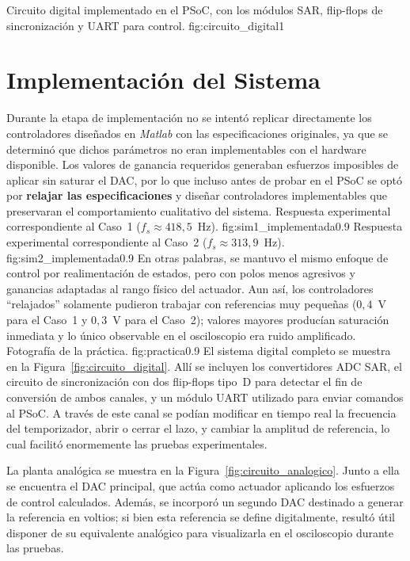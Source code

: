 
{Circuito digital implementado en el PSoC, con los módulos SAR, flip-flops de sincronización y UART para control.}
{fig:circuito_digital}{1}
\section{Implementación del Sistema}

Durante la etapa de implementación no se intentó replicar directamente los controladores diseñados en \textit{Matlab} con las especificaciones originales, 
ya que se determinó que dichos parámetros no eran implementables con el hardware disponible. 
Los valores de ganancia requeridos generaban esfuerzos imposibles de aplicar sin saturar el DAC, 
por lo que incluso antes de probar en el PSoC se optó por \textbf{relajar las especificaciones} 
y diseñar controladores implementables que preservaran el comportamiento cualitativo del sistema.
{Respuesta experimental correspondiente al Caso~1 ($f_s \approx 418{,}5$~Hz).}
{fig:sim1_implementada}{0.9}
{Respuesta experimental correspondiente al Caso~2 ($f_s \approx 313{,}9$~Hz).}
{fig:sim2_implementada}{0.9}
En otras palabras, se mantuvo el mismo enfoque de control por realimentación de estados, 
pero con polos menos agresivos y ganancias adaptadas al rango físico del actuador. 
Aun así, los controladores “relajados” solamente pudieron trabajar con referencias muy pequeñas 
($0{,}4$~V para el Caso~1 y $0{,}3$~V para el Caso~2); 
valores mayores producían saturación inmediata y lo único observable en el osciloscopio era ruido amplificado.
{Fotografía de la práctica.}
{fig:practica}{0.9}
El sistema digital completo se muestra en la Figura~\ref{fig:circuito_digital}. 
Allí se incluyen los convertidores \textsc{ADC SAR}, 
el circuito de sincronización con dos flip-flops tipo~D para detectar el fin de conversión de ambos canales, 
y un módulo \textsc{UART} utilizado para enviar comandos al PSoC. 
A través de este canal se podían modificar en tiempo real la frecuencia del temporizador, 
abrir o cerrar el lazo, y cambiar la amplitud de referencia, 
lo cual facilitó enormemente las pruebas experimentales.




La planta analógica se muestra en la Figura~\ref{fig:circuito_analogico}. 
Junto a ella se encuentra el DAC principal, que actúa como actuador aplicando los esfuerzos de control calculados. 
Además, se incorporó un segundo DAC destinado a generar la referencia en voltios; 
si bien esta referencia se define digitalmente, resultó útil disponer de su equivalente analógico para visualizarla en el osciloscopio durante las pruebas.



